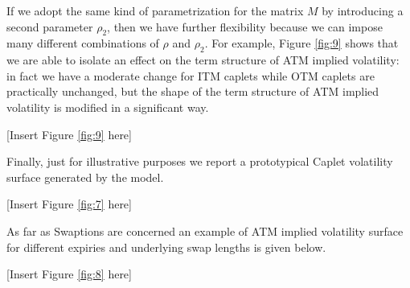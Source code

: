 If we adopt the same kind of parametrization for the matrix $M$ by introducing a second parameter $\rho_2$, then we have further flexibility because we can impose many different combinations of $\rho$ and $\rho_2$. For example, Figure \ref{fig:9} shows that we are able  to isolate an effect on the term structure of ATM implied volatility: in fact we have a moderate change for ITM caplets while OTM caplets are practically unchanged, but the shape of the term structure of ATM implied volatility is modified in a significant way.
\begin{center}
[Insert Figure \ref{fig:9}  here]
\end{center}

Finally, just for illustrative purposes we report a prototypical Caplet volatility surface generated by the model.
\begin{center}
[Insert Figure \ref{fig:7}  here]
\end{center}
As far as Swaptions are concerned an example of ATM implied volatility surface for different expiries and underlying swap lengths is given below.
\begin{center}
[Insert Figure \ref{fig:8}  here]
\end{center}
